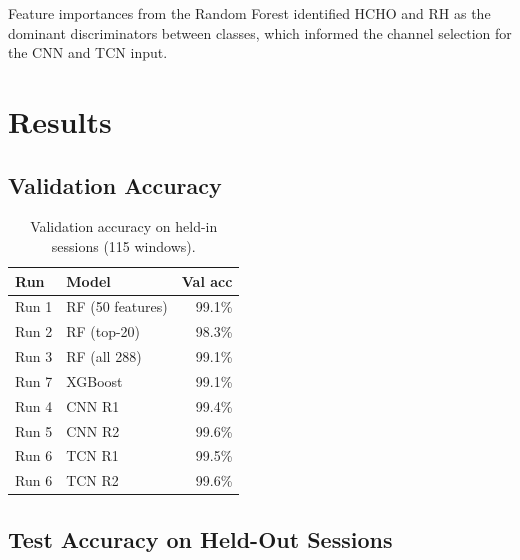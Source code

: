 \documentclass[11pt, a4paper]{article}
\begin{document}
Feature importances from the Random Forest identified HCHO and RH as the
dominant discriminators between classes, which informed the channel selection
for the CNN and TCN input.

\section{Results}

\subsection{Validation Accuracy}

\begin{table}[H]
\centering
\caption{Validation accuracy on held-in sessions (115 windows).}
\begin{tabular}{llr}
\toprule
\textbf{Run} & \textbf{Model} & \textbf{Val acc} \\
\midrule
Run 1 & RF (50 features)    & 99.1\% \\
Run 2 & RF (top-20)         & 98.3\% \\
Run 3 & RF (all 288)        & 99.1\% \\
Run 7 & XGBoost             & 99.1\% \\
Run 4 & CNN R1              & 99.4\% \\
Run 5 & CNN R2              & 99.6\% \\
Run 6 & TCN R1              & 99.5\% \\
Run 6 & TCN R2              & 99.6\% \\
\bottomrule
\end{tabular}
\end{table}

\subsection{Test Accuracy on Held-Out Sessions}
\end{document}
